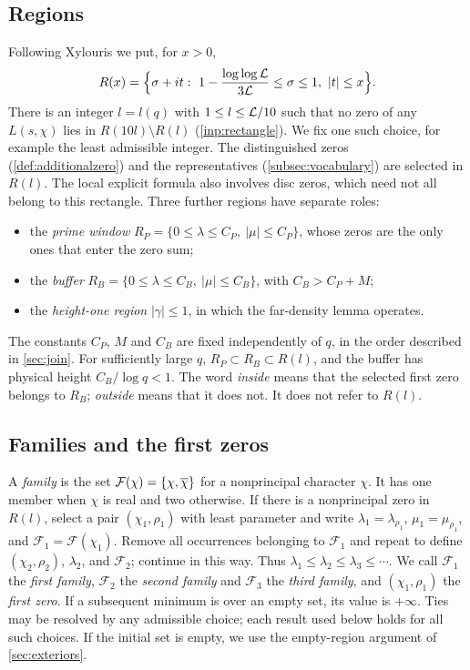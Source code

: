 \subsection{Regions}
Following Xylouris \cite[(3.7)]{Xylouris2011nullstellen} we put, for $x>0$,
\[
  R(x)=\Bigl\{\sigma+it:\ 1-\frac{\log\log\LL}{3\LL}\le\sigma\le1,\ |t|\le x\Bigr\}.
\]
There is an integer $l=l(q)$ with $1\le l\le\mathcal{L}/10$ such that no zero of any $L(s,\chi)$ lies in
$R(10l)\setminus R(l)$ (\cref{inp:rectangle}). We fix one such choice, for example the least
admissible integer. The distinguished zeros (\cref{def:additionalzero}) and the representatives
(\cref{subsec:vocabulary}) are selected in $R(l)$.
The local explicit formula also involves disc zeros, which need not all belong to this
rectangle. Three further regions have separate roles:
\begin{itemize}
  \item the \emph{prime window} $R_P=\{0\le\lambda\le C_P,\ |\mu|\le C_P\}$, whose zeros are the only
    ones that enter the zero sum;
  \item the \emph{buffer} $R_B=\{0\le\lambda\le C_B,\ |\mu|\le C_B\}$, with $C_B>C_P+M$;
  \item the \emph{height-one region} $|\gamma|\le1$, in which the far-density lemma operates.
\end{itemize}
The constants $C_P$, $M$ and $C_B$ are fixed independently of $q$, in the order described in
\cref{sec:join}. For sufficiently large $q$, $R_P\subset R_B\subset R(l)$, and the buffer
has physical height $C_B/\log q<1$. The word \emph{inside} means that the selected first
zero belongs to $R_B$; \emph{outside} means that it does not. It does not refer to $R(l)$.

\subsection{Families and the first zeros}
\begin{definition}\label{def:families}
A \emph{family} is the set $\mathcal F(\chi)=\{\chi,\overline{\chi}\}$ for a nonprincipal character
$\chi$. It has one member when $\chi$ is real and two otherwise.
If there is a nonprincipal zero in $R(l)$, select a pair $(\chi_1,\rho_1)$ with least
parameter and write $\lambda_1=\lambda_{\rho_1}$, $\mu_1=\mu_{\rho_1}$, and
$\mathcal F_1=\mathcal F(\chi_1)$. Remove all occurrences belonging to $\mathcal F_1$ and
repeat to define $(\chi_2,\rho_2)$, $\lambda_2$, and $\mathcal F_2$; continue in this way.
Thus $\lambda_1\le\lambda_2\le\lambda_3\le\cdots$. We call $\mathcal F_1$ the \emph{first family},
$\mathcal F_2$ the \emph{second family} and $\mathcal F_3$ the \emph{third family}, and $(\chi_1,\rho_1)$
the \emph{first zero}.
If a subsequent minimum is over an empty set, its value is $+\infty$.
Ties may be resolved by any admissible choice; each result used below holds for all such
choices. If the initial set is empty, we use the empty-region argument of
\cref{sec:exteriors}.
\end{definition}

